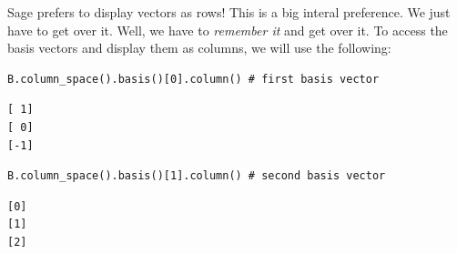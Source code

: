 \documentclass[10pt,]{book}
\theoremstyle{plain}
\theoremstyle{definition}
\numberwithin{equation}{section}
\begin{document}
      Sage prefers to display vectors as rows! This is a big interal preference.
      We just have to get over it. Well, we have to \emph{remember it} and get over it.
      To access the basis vectors and display them as columns,
      we will use the following:
\begin{lstlisting}[style=sageinput]
B.column_space().basis()[0].column() # first basis vector
\end{lstlisting}
\begin{lstlisting}[style=sageoutput]
[ 1]
[ 0]
[-1]
\end{lstlisting}
\begin{lstlisting}[style=sageinput]
B.column_space().basis()[1].column() # second basis vector
\end{lstlisting}
\begin{lstlisting}[style=sageoutput]
[0]
[1]
[2]
\end{lstlisting}
\typeout{************************************************}
\typeout{************************************************}
\end{document}

